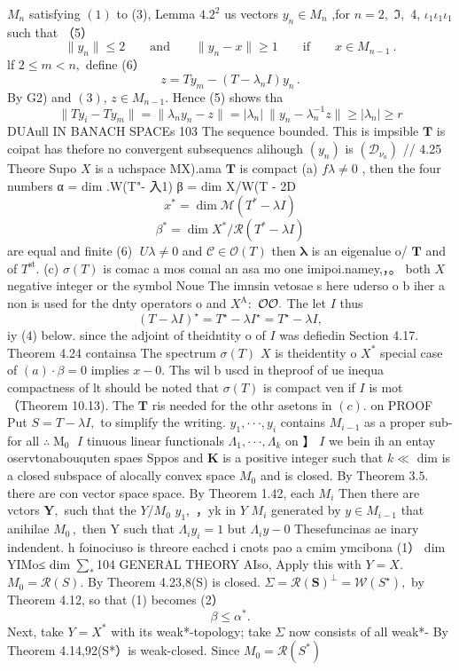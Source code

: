 $M_{n}$ satisfying $\operatorname{\left(1\right)}$ to (3), Lemma $4.2^{2}$ us vectors $y_{n}\in M_{n}$ ,for $n=2,$ ${\mathfrak{I}},$ 4, $\iota_{1}\iota_{1}\iota_{1}$ such that （5） $$ \|y_{n}\|\leq2\qquad{\mathrm{and}}\qquad\|y_{n}-x\|\geq1\qquad{\mathrm{if}}\qquad x\in M_{n-1}~. $$ lf $2\leq m<n,$ define (6） $$ z=T y_{m}-(T-\lambda_{n}I)y_{n}\,. $$ By G2) and $(3),\,z\in M_{n-1}.$ Hence (5) shows tha $$ \|T y_{i}-T y_{m}\|=\|\lambda_{n}y_{n}-z\|=|\lambda_{n}|\ \|y_{n}-\lambda_{n}^{-1}z\|\geq|\lambda_{n}|\geq r $$DUAull IN BANACH SPACEs 103 The sequence bounded. This is impsible ${\boldsymbol{T}}$ is coipat has thefore no convergent subsequencs alihough $\scriptstyle(y_{n})$ is $(\mathcal{D}_{\nu_{a}})$ // 4.25 Theore Supo $X$ is a uchspace MX).ama ${\boldsymbol{T}}$ is compact (a) $f\lambda\neq0$ , then the four numbers α = dim .W(T"- 入1) β = dim X/W(T - 2D $$ x^{*}=\dim{\mathcal{M}}(T^{*}-{\lambda}I) $$ $$ \beta^{*}=\dim X^{*}/{\mathcal{R}}(T^{*}-\lambda I) $$ are equal and finite (6) $\;U\lambda\neq0$ and ${\mathcal{C}}\in{\mathcal{O}}(T)$ then $\boldsymbol{\lambda}$ is an eigenalue o/ ${\boldsymbol{T}}$ and of $T^{\mathrm{st}}.$ (c) $\sigma(T)$ is comac a mos comal an asa mo one imipoi.namey,，。 both $\textstyle X$ negative integer or the symbol Noue The imnsin vetosae s here uderso o b iher a non is used for the dnty operators o and $X^{\mathrm{A}}:$ ${\cal O}{\cal O}.$ The let $\boldsymbol{\mathit{I}}$ thus $$ (T-\lambda I)^{\star}=T^{\star}-\lambda I^{\star}=T^{\star}-\lambda I, $$ iy (4) below. since the adjoint of theidntity o of $\boldsymbol{\mathit{I}}$ was defiedin Section 4.17. Theorem 4.24 containsa The spectrum $\sigma(T)$ $X$ is theidentity o $X^{\ast}$ special case of $(a)\cdot\beta=0$ implies $x-0.$ Ths wil b uscd in theproof of ue inequa compactness of lt should be noted that $\sigma(T)$ is compact ven if $\boldsymbol{\mathit{I}}$ is mot （Theorem 10.13). The ${\boldsymbol{T}}$ ris needed for the othr asetons in $(c).$ on PROOF Put $S=T-\lambda I,$ to simplify the writing. $y_{1},\cdot\cdot\cdot,y_{i}$ contains $M_{i-1}$ as a proper sub- for all $\therefore\mathop{M}_{0}$ $\boldsymbol{\mathit{I}}$ tinuous linear functionals $\Lambda_{1},\cdot\cdot\cdot,\Lambda_{k}$ on 】 $\boldsymbol{\mathit{I}}$ we bein ih an entay oservtonabouquten spaes Sppos and $\boldsymbol{K}$ is a positive integer such that $k\ll$ dim is a closed subspace of alocally convex space $M_{0}$ and is closed. By Theorem $3.5.$ there are con vector space space. By Theorem 1.42, each $M_{i}$ Then there are vctors ${\boldsymbol{Y}},$ such that the $Y/M_{0}$ $y_{1},$ ，yk in ${\mathbf{}}Y$ $M_{i}$ generated by $y\in M_{i-1}$ that anihilae $M_{0}\,,$ then Y such that $\Lambda_{i}y_{i}=1$ but $\Lambda_{i}y-0$ Thesefuncinas ae inary indendent. h foinociuso is threore eachcd i cnots pao a cmim ymcibona (1） dim YIMo≤ dim $\textstyle\sum_{*}$104 GENERAL THEORY AIso, Apply this with $Y=X.$ $M_{0}={\mathcal{R}}(S).$ By Theorem 4.23,8(S) is closed. $\Sigma={\mathcal R}(\mathbf{S})^{\bot}={\mathcal W}(S^{\star}),$ by Theorem 4.12, so that (1) becomes (2） $$ \beta\leq\alpha^{*}. $$ Next, take $Y=X^{*}$ with its weak*-topology; take $\Sigma$ now consists of all weak*- By Theorem 4.14,92(S*）is weak-closed. Since $M_{0}={\mathcal{R}}(S^{\ast})$ 
